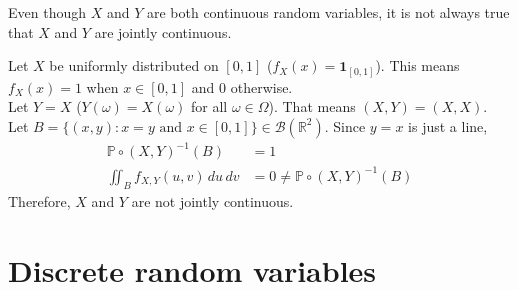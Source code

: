 \documentclass{huhtakm-template-book}
\newcommand{\prob}{\mathbb{P}}
\begin{document}
    \begin{rem}
        Even though $X$ and $Y$ are both continuous random variables, it is not always true that $X$ and $Y$ are jointly continuous.
    \end{rem}
    \begin{eg}
        Let $X$ be uniformly distributed on $[0,1]$ ($f_{X}(x)=\mathbf{1}_{[0,1]}$). This means $f_{X}(x)=1$ when $x\in[0,1]$ and $0$ otherwise.\\
        Let $Y=X$ ($Y(\omega)=X(\omega)$ for all $\omega\in\Omega$). That means $(X,Y)=(X,X)$.\\
        Let $B=\{(x,y):x=y\text{ and }x\in[0,1]\}\in\mathcal{B}(\mathbb{R}^{2})$. Since $y=x$ is just a line,
        \begin{align*}
            \prob\circ(X,Y)^{-1}(B)&=1\\
            \iint_{B}f_{X,Y}(u,v)\,du\,dv&=0\neq\prob\circ(X,Y)^{-1}(B)
        \end{align*}
        Therefore, $X$ and $Y$ are not jointly continuous.
    \end{eg}
    
\newpage
\chapter{Discrete random variables}
\end{document}
